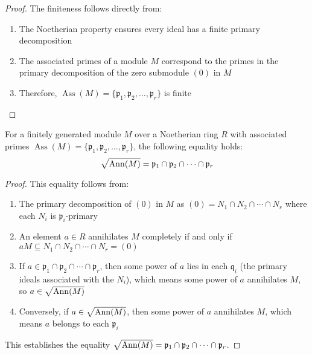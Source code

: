 \documentclass[12pt]{article}
\DeclareMathOperator{\Ass}{Ass}
\begin{document}
\begin{proof}
    The finiteness follows directly from:
    \begin{enumerate}[label=(\arabic*)]
        \item The Noetherian property ensures every ideal has a finite primary decomposition
        \item The associated primes of a module $M$ correspond to the primes in the primary decomposition of the zero submodule $(0)$ in $M$
        \item Therefore, $\Ass(M) = \{\mathfrak{p}_1, \mathfrak{p}_2, \ldots, \mathfrak{p}_r\}$ is finite
    \end{enumerate}
\end{proof}

\begin{theorem}
    For a finitely generated module $M$ over a Noetherian ring $R$ with associated primes $\Ass(M) = \{\mathfrak{p}_1, \mathfrak{p}_2, \ldots, \mathfrak{p}_r\}$, the following equality holds:
    \[
        \sqrt{\operatorname{Ann}(M)} = \mathfrak{p}_1 \cap \mathfrak{p}_2 \cap \cdots \cap \mathfrak{p}_r
    \]
\end{theorem}

\begin{proof}
    This equality follows from:
    \begin{enumerate}[label=(\arabic*)]
        \item The primary decomposition of $(0)$ in $M$ as $(0) = N_1 \cap N_2 \cap \cdots \cap N_r$ where each $N_i$ is $\mathfrak{p}_i$-primary

        \item An element $a \in R$ annihilates $M$ completely if and only if $aM \subseteq N_1 \cap N_2 \cap \cdots \cap N_r = (0)$

        \item If $a \in \mathfrak{p}_1 \cap \mathfrak{p}_2 \cap \cdots \cap \mathfrak{p}_r$, then some power of $a$ lies in each $\mathfrak{q}_i$ (the primary ideals associated with the $N_i$), which means some power of $a$ annihilates $M$, so $a \in \sqrt{\operatorname{Ann}(M)}$

        \item Conversely, if $a \in \sqrt{\operatorname{Ann}(M)}$, then some power of $a$ annihilates $M$, which means $a$ belongs to each $\mathfrak{p}_i$
    \end{enumerate}

    This establishes the equality $\sqrt{\operatorname{Ann}(M)} = \mathfrak{p}_1 \cap \mathfrak{p}_2 \cap \cdots \cap \mathfrak{p}_r$.
\end{proof}
\end{document}
